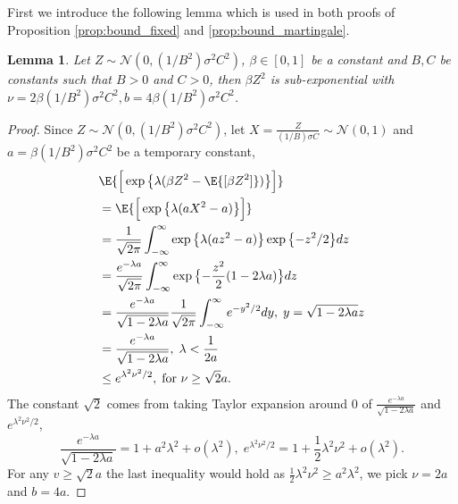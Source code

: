 \documentclass[letterpaper]{article} %
\newtheorem{lemma}[theorem]{Lemma}
\def\cN{\mathcal{N}}
\begin{document}
First we introduce the following lemma which is used in both proofs of Proposition \ref{prop:bound_fixed} and \ref{prop:bound_martingale}.
\begin{lemma}
\label{lemma:zk2_sub_exponential}
    Let $Z \sim \cN(0, (1/B^2)\sigma^2 C^2)$, $\beta \in [0,1]$ be a constant and $B, C$ be constants such that $B>0$ and $C>0$, then $\beta Z^2$ is sub-exponential with $\nu=2\beta(1/B^2)\sigma^2C^2, b=4\beta(1/B^2)\sigma^2C^2$.
\end{lemma}
\begin{proof}
    Since $Z \sim \cN(0, (1/B^2)\sigma^2 C^2)$, let $X = \frac{Z}{(1/B)\sigma C} \sim \cN(0,1)$ and $a=\beta(1/B^2)\sigma^2C^2$ be a temporary constant,
    \begin{align*}
        &\E{\Big[ \exp{\bigl\{ \lambda (\beta Z^2 - \E{[\beta Z^2]}) \bigl\} }\Big]} \\
        &= \E{\Big[ \exp{\bigl\{ \lambda (a X^2  - a) \bigl\}}\Big]} \\
        &= \frac{1}{\sqrt{2\pi}} \int_{-\infty}^{\infty} \exp{ \bigl\{ \lambda (a z^2 - a) \bigl\}} \exp{\bigl\{-z^2/2\bigl\} } dz \\
        &= \frac{e^{-\lambda a}}{\sqrt{2\pi}} \int_{-\infty}^{\infty} \exp{\bigl\{ -\frac{z^2}{2}(1-2\lambda a)\bigl\} } dz \\
        &= \frac{e^{-\lambda a}}{\sqrt{1-2\lambda a}} \frac{1}{\sqrt{2\pi}} \int_{-\infty}^{\infty} e^{-y^2/2} dy, \; y=\sqrt{1-2\lambda a}z \\
        &= \frac{e^{-\lambda a}}{\sqrt{1-2\lambda a}}, \; \lambda < \frac{1}{2a} \\
        & \leq e^{\lambda^2 \nu^2/2}, \; \textnormal{for } \nu \geq \sqrt{2}a.
    \end{align*}
    The constant $\sqrt{2}$ comes from taking Taylor expansion around 0 of $\frac{e^{-\lambda a}}{\sqrt{1-2\lambda a}}$ and $e^{\lambda^2 \nu^2/2}$,
    \begin{equation*}
        \frac{e^{-\lambda a}}{\sqrt{1-2\lambda a}} = 1 + a^2\lambda^2 + o(\lambda^2), \; e^{\lambda^2 \nu^2/2} = 1 + \frac{1}{2}\lambda^2 \nu^2 + o(\lambda^2).
    \end{equation*}
    For any $v \geq \sqrt{2}a$ the last inequality would hold as $\frac{1}{2}\lambda^2 \nu^2 \geq a^2\lambda^2$, we pick $\nu = 2a$ and $b=4a$.
\end{proof}
\end{document}
